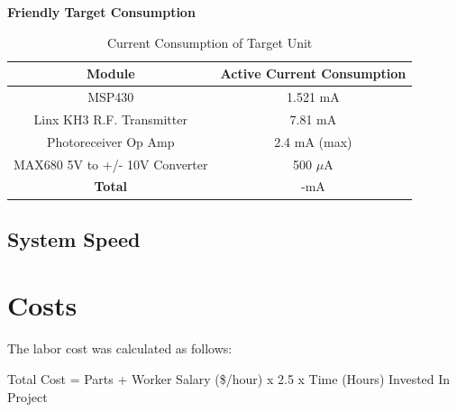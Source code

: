 \documentclass[letterpaper,10pt]{article}
\begin{document}
\begin{spacing}{1.15}
\hspace{5mm}\textbf{Friendly Target Consumption} \label{section:ttarget-consumption}
\begin{table}[H]
	\centering
	\begin{tabular}{c|c}	%
		\toprule	%
		Module & Active Current Consumption \\
		\midrule
		MSP430 & 1.521 mA \\ 
		Linx KH3 R.F. Transmitter & 7.81 mA\\
		Photoreceiver Op Amp & 2.4 mA (max)\\
		MAX680 5V to +/- 10V Converter & 500 $\mu$A \\
		\bottomrule	%
		\textbf{Total} & -mA \\
	\end{tabular}%
	\caption{Current Consumption of Target Unit}
	\label{tab:table2}	%
\end{table}%

\subsection{System Speed}


\section{Costs}

The labor cost was calculated as follows:

\begin{center}
	Total Cost = Parts + Worker Salary (\$/hour) x 2.5 x Time (Hours) Invested In Project
\end{center}


\end{spacing}
\end{document}
